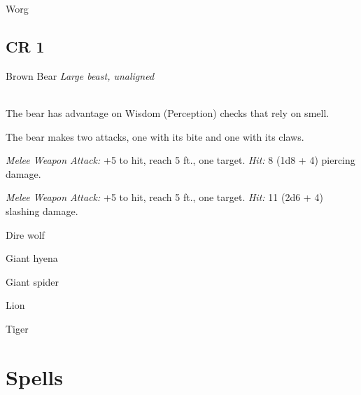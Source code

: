 \documentclass[10pt,twoside,twocolumn,openany]{book}
\begin{document}
Worg
\newpage
\section{CR 1}

\begin{monsterboxnobg}{Brown Bear}
	\textit{Large beast, unaligned}\\
	\hline
	\basics[
		armorclass	= 11 (natural armor),
		hitpoints		= 34 (4d10 + 12),
		speed		= {40 ft., climb 30 ft.}
	]
	\hline
	\stats[
		STR	= \stat{19},
		DEX	= \stat{10},
		CON	= \stat{16},
		INT	= \stat{2},
		WIS	= \stat{13},
		CHA	= \stat{7}
	]
	\hline
	\details[
		skills			= {Perception +3},
		senses		= {passive Perception 13},
		languages		= {-},
		challenge		= 1
	]
	\hline \\[1mm]
	\begin{monsteraction}
		The bear has advantage on Wisdom (Perception) checks that rely on smell.
	\end{monsteraction}
	\begin{monsteraction}[Multiattack]
		The bear makes two attacks, one with its bite and one with its claws.
	\end{monsteraction}
	
	\begin{monsteraction}[Bite]
		\textit{Melee Weapon Attack:} +5 to hit, reach 5 ft., one target. \textit{Hit:} 8 (1d8 + 4) piercing damage.
	\end{monsteraction}
	
	\begin{monsteraction}[Claws]
		\textit{Melee Weapon Attack:} +5 to hit, reach 5 ft., one target. \textit{Hit:} 11 (2d6 + 4) slashing damage.
	\end{monsteraction}	
\end{monsterboxnobg}

Dire wolf

Giant hyena

Giant spider

Lion

Tiger
\chapter{Spells}
\end{document}

